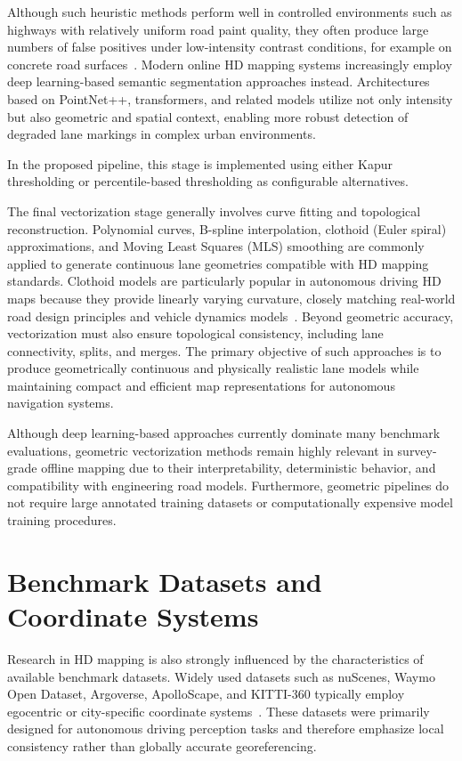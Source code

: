 Although such heuristic methods perform well in controlled environments such as highways with relatively uniform road paint quality, they often produce large numbers of false positives under low-intensity contrast conditions, for example on concrete road surfaces~\cite{IntensityThresholdingandDeepLearningBasedLaneMarkingExtraction}. Modern online HD mapping systems increasingly employ deep learning-based semantic segmentation approaches instead. Architectures based on PointNet++, transformers, and related models utilize not only intensity but also geometric and spatial context, enabling more robust detection of degraded lane markings in complex urban environments.

In the proposed pipeline, this stage is implemented using either Kapur thresholding or percentile-based thresholding as configurable alternatives.

The final vectorization stage generally involves curve fitting and topological reconstruction. Polynomial curves, B-spline interpolation, clothoid (Euler spiral) approximations, and Moving Least Squares (MLS) smoothing are commonly applied to generate continuous lane geometries compatible with HD mapping standards. Clothoid models are particularly popular in autonomous driving HD maps because they provide linearly varying curvature, closely matching real-world road design principles and vehicle dynamics models~\cite{RoadNetworkGenerationTechniquesReview}. Beyond geometric accuracy, vectorization must also ensure topological consistency, including lane connectivity, splits, and merges. The primary objective of such approaches is to produce geometrically continuous and physically realistic lane models while maintaining compact and efficient map representations for autonomous navigation systems.

Although deep learning-based approaches currently dominate many benchmark evaluations, geometric vectorization methods remain highly relevant in survey-grade offline mapping due to their interpretability, deterministic behavior, and compatibility with engineering road models. Furthermore, geometric pipelines do not require large annotated training datasets or computationally expensive model training procedures.

\section{Benchmark Datasets and Coordinate Systems}
\label{sec:datasets}

Research in HD mapping is also strongly influenced by the characteristics of available benchmark datasets. Widely used datasets such as nuScenes, Waymo Open Dataset, Argoverse, ApolloScape, and KITTI-360 typically employ egocentric or city-specific coordinate systems~\cite{nuscenes, waymo, argoverse, apolloscape, kitti-360}. These datasets were primarily designed for autonomous driving perception tasks and therefore emphasize local consistency rather than globally accurate georeferencing.


